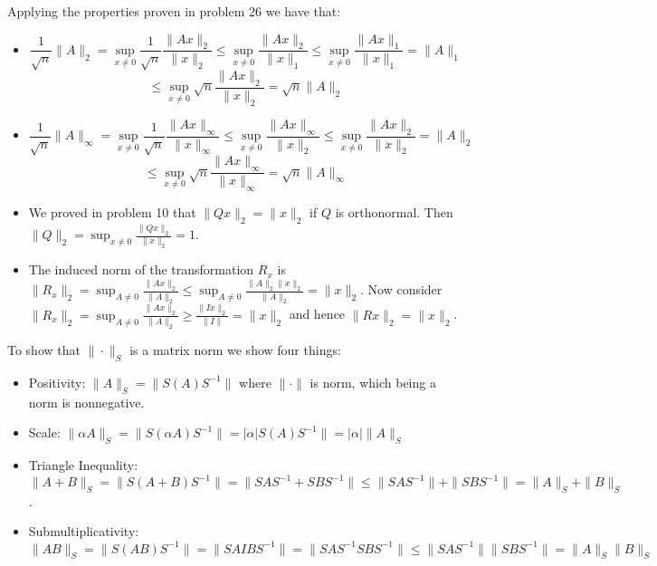 \documentclass[12pt]{article}
\newenvironment{problem}[2][Problem]{\begin{trivlist}
\item[\hskip \labelsep {\bfseries #1}\hskip \labelsep {\bfseries #2}]}{\end{trivlist}}
\begin{document}
 
\begin{problem}{28.} Applying the properties proven in problem 26 we have that:
\begin{itemize}
\item [(i)]   $$\frac{1}{\sqrt{n}}\|A\|_2 =  \sup_{x\neq0}\frac{1}{\sqrt{n}} \frac{\|Ax\|_2}{\|x\|_2} \leq  \sup_{x\neq0} \frac{\|Ax\|_2}{\|x\|_1} \leq  \sup_{x\neq0} \frac{\|Ax\|_1}{\|x\|_1} = \|A\|_1  $$
$$ \leq  \sup_{x\neq0} \sqrt{n}\frac{\|Ax\|_2}{\|x\|_2}= \sqrt{n}\|A\|_2 $$
\item [(ii)] $$ \frac{1}{\sqrt{n}}\|A\|_\infty = \sup_{x\neq0} \frac{1}{\sqrt{n}} \frac{\|Ax\|_\infty}{\|x\|_\infty} \leq  \sup_{x\neq0}  \frac{\|Ax\|_{\infty}}{\|x\|_2} \leq \sup_{x\neq0}  \frac{\|Ax\|_2}{\|x\|_2} = \|A\|_2 $$ $$ \leq  \sup_{x\neq0} \sqrt{n}\frac{\|Ax\|_\infty}{\|x\|_\infty} = \sqrt{n}\|A\|_\infty$$
\end{itemize} 
\end{problem}


\begin{problem}{29.} \hfill
\begin{itemize}
\item[(i)] We proved in problem 10 that $\|Qx\|_2 = \|x\|_2$ if $Q$ is orthonormal. Then $\|Q\|_2 = \sup_{x\neq 0} \frac{\|Qx\|_2}{\|x\|_2} = 1$.  
\item[(ii)] The induced norm of the transformation $R_x$ is $\|R_x\|_2 = \sup_{A\neq 0} \frac{\|Ax\|_2}{\|A\|_2} \leq \sup_{A\neq 0} \frac{\|A\|_2 \|x\|_2}{\|A\|_2} = \|x\|_2$. Now consider $\|R_x\|_2 = \sup_{A\neq 0} \frac{\|Ax\|_2}{\|A\|_2} \geq \frac{\|Ix\|_2}{\|I\|} = \|x\|_2$ and hence $\|Rx\|_2 = \|x\|_2$. 
\end{itemize}
\end{problem}


\begin{problem}{30.} To show that $\| \cdot \|_S$ is a matrix norm we show four things:
\begin{itemize}
\item [(i)]  Positivity: $\|A\|_S = \|S(A)S^{-1}\|$ where $\| \cdot \|$ is norm, which being a norm is nonnegative. 
\item [(ii)] Scale: $\|\alpha A\|_S = \|S(\alpha A)S^{-1}\| = |\alpha| S(A)S^{-1}\|= |\alpha| \| A\|_S$
\item [(iii)] Triangle Inequality: $\|A+B\|_S =  \|S(A + B)S^{-1}\| = \|SAS^{-1} + SBS^{-1}\| \leq  \|SAS^{-1}\| + \|SBS^{-1}\| = \|A\|_S + \|B\|_S$. 
\item [(iv)] Submultiplicativity: $\|AB\|_S = \|S(AB)S^{-1}\| = \|SAIBS^{-1}\|  = \|SAS^{-1}SBS^{-1}\| \leq \|SAS^{-1}\|\|SBS^{-1}\| = \|A\|_S\|B\|_S$
\end{itemize} 
\end{problem}
\end{document}
